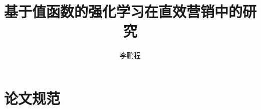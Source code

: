 \documentclass[master]{ustcthesis}
\title{基于值函数的强化学习在直效营销中的研究}
\author{李鹏程}
\begin{document}
\maketitle

%

\frontmatter

\tableofcontents
\listoffigures
\listoftables
\listofalgorithms


\mainmatter
% 



% 

% 
% 

% 
% 
% 


\appendix
\chapter{论文规范}

\backmatter


\end{document}
